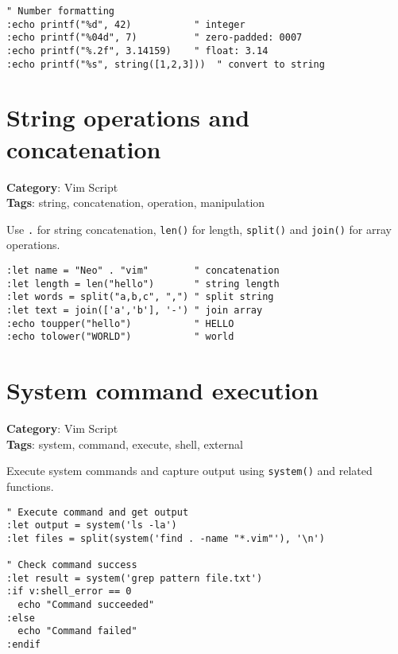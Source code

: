 {{{{{{{{{{{{{{{{{{{\begin{Exa*}{}
\begin{Verbatim}[fontsize=\footnotesize, breaklines, breakanywhere]
" Number formatting
:echo printf("%d", 42)           " integer
:echo printf("%04d", 7)          " zero-padded: 0007
:echo printf("%.2f", 3.14159)    " float: 3.14
:echo printf("%s", string([1,2,3]))  " convert to string
\end{Verbatim}
\end{Exa*}

\section{String operations and concatenation}

\textbf{Category}: Vim Script\\ \textbf{Tags}: string, concatenation, operation, manipulation
\vspace{0.5cm}

Use {\footnotesize \Verb§.§} for string concatenation, {\footnotesize \Verb§len()§} for length, {\footnotesize \Verb§split()§} and {\footnotesize \Verb§join()§} for array operations.

\begin{Exa*}{}
\begin{Verbatim}[fontsize=\footnotesize, breaklines, breakanywhere]
:let name = "Neo" . "vim"        " concatenation
:let length = len("hello")       " string length
:let words = split("a,b,c", ",") " split string
:let text = join(['a','b'], '-') " join array
:echo toupper("hello")           " HELLO
:echo tolower("WORLD")           " world
\end{Verbatim}
\end{Exa*}

\section{System command execution}

\textbf{Category}: Vim Script\\ \textbf{Tags}: system, command, execute, shell, external
\vspace{0.5cm}

Execute system commands and capture output using {\footnotesize \Verb§system()§} and related functions.

\begin{Exa*}{}
\begin{Verbatim}[fontsize=\footnotesize, breaklines, breakanywhere]
" Execute command and get output
:let output = system('ls -la')
:let files = split(system('find . -name "*.vim"'), '\n')

" Check command success
:let result = system('grep pattern file.txt')
:if v:shell_error == 0
  echo "Command succeeded"
:else
  echo "Command failed"
:endif
\end{Verbatim}
\end{Exa*}

}}}}}}}}}}}}}}}}}}}
